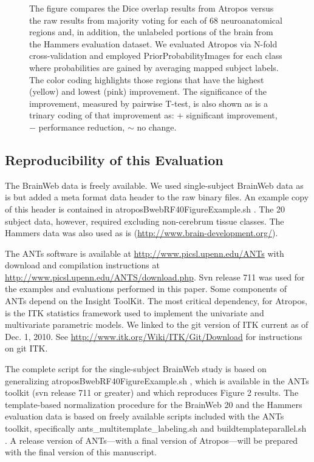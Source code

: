 \documentclass[11pt,english]{article}
\begin{document}
\begin{figure}
\begin{center}
\begin{tabular}{c}
\end{tabular}
\caption{\baselineskip 12pt \small The figure compares the Dice
overlap results from Atropos versus the raw results from majority
voting for each of 68 neuroanatomical regions and, in addition, the
unlabeled portions of the brain from the Hammers evaluation dataset.
We evaluated Atropos via N-fold cross-validation and employed
PriorProbabilityImages for each class where probabilities are gained
by averaging mapped subject labels. The color coding highlights those
regions that have the highest (yellow) and lowest (pink) improvement.
The significance of the improvement, measured by pairwise T-test, is
also shown as is a trinary coding of that improvement as: $+$
significant improvement, $-$ performance reduction, $\sim$ no change.}
\label{fig:hammers}
\end{center}
\end{figure}

\subsection{Reproducibility of this Evaluation}
 The BrainWeb data is freely available.  We used
single-subject BrainWeb data as is but added a meta format data header
to the raw binary files.  An example copy of this header is contained
in {\ttfamily atroposBwebRF40FigureExample.sh }.  The 20 subject data,
however, required excluding non-cerebrum tissue classes.  The Hammers
data was also used as is (\url{http://www.brain-development.org/}).

 The ANTs software is available at \url{http://www.picsl.upenn.edu/ANTs} with download and compilation
instructions at \url{http://www.picsl.upenn.edu/ANTS/download.php}.
Svn release 711 was used for the examples and evaluations performed in
this paper.  Some components of ANTs depend on the Insight ToolKit.
The most critical dependency, for Atropos, is the ITK statistics framework
used to implement the univariate and multivariate parametric models.
We linked to the git version of ITK current as of Dec. 1, 2010.  See
\url{http://www.itk.org/Wiki/ITK/Git/Download} for instructions on git ITK.

 The complete script for the single-subject
BrainWeb study is based on generalizing {\ttfamily atroposBwebRF40FigureExample.sh }, which is available in the ANTs
toolkit (svn release 711 or greater) and which reproduces Figure 2
results.  The template-based normalization procedure for the BrainWeb
20 and the Hammers evaluation data is based on freely available
scripts included with the ANTs toolkit, specifically {\ttfamily
  ants\_multitemplate\_labeling.sh } and {\ttfamily
  buildtemplateparallel.sh }.  A release version of ANTs---with a final version of Atropos---will
be prepared with the final version of this manuscript.
\end{document}
